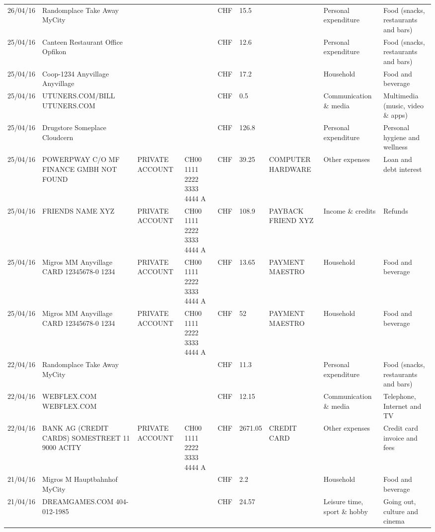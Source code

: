 \begin{landscape}
\begin{table}[t]
\begin{center}
\begin{tabular}{lllllllll}
		26/04/16 & Randomplace Take Away     MyCity &       &       & CHF   & 15.5  &       & Personal expenditure & Food (snacks, restaurants and bars) \\
		25/04/16 & Canteen Restaurant Office      Opfikon &       &       & CHF   & 12.6  &       & Personal expenditure & Food (snacks, restaurants and bars) \\
		25/04/16 & Coop-1234 Anyvillage    Anyvillage &       &       & CHF   & 17.2  &       & Household & Food and beverage \\
		25/04/16 & UTUNERS.COM/BILL          UTUNERS.COM &       &       & CHF   & 0.5   &       & Communication \& media & Multimedia (music, video \& apps) \\
		25/04/16 & Drugstore Someplace      Cloudcern &       &       & CHF   & 126.8 &       & Personal expenditure & Personal hygiene and wellness \\
		25/04/16 & POWERPWAY C/O MF FINANCE GMBH NOT FOUND & PRIVATE ACCOUNT & CH00 1111 2222 3333 4444 A & CHF   & 39.25 & COMPUTER HARDWARE & Other expenses & Loan and debt interest \\
		25/04/16 & FRIENDS NAME XYZ & PRIVATE ACCOUNT & CH00 1111 2222 3333 4444 A & CHF   & 108.9 & PAYBACK FRIEND XYZ & Income \& credits & Refunds \\
		25/04/16 & Migros MM Anyvillage CARD 12345678-0 1234 & PRIVATE ACCOUNT & CH00 1111 2222 3333 4444 A & CHF   & 13.65 & PAYMENT MAESTRO & Household & Food and beverage \\
		25/04/16 & Migros MM Anyvillage CARD 12345678-0 1234 & PRIVATE ACCOUNT & CH00 1111 2222 3333 4444 A & CHF   & 52    & PAYMENT MAESTRO & Household & Food and beverage \\
		22/04/16 & Randomplace Take Away     MyCity &       &       & CHF   & 11.3  &       & Personal expenditure & Food (snacks, restaurants and bars) \\
		22/04/16 & WEBFLEX.COM              WEBFLEX.COM &       &       & CHF   & 12.15 &       & Communication \& media & Telephone,  Internet and TV \\
		22/04/16 & BANK AG (CREDIT CARDS) SOMESTREET 11 9000 ACITY & PRIVATE ACCOUNT & CH00 1111 2222 3333 4444 A & CHF   & 2671.05 & CREDIT CARD & Other expenses & Credit card invoice and fees \\
		21/04/16 & Migros M Hauptbahnhof    MyCity &       &       & CHF   & 2.2   &       & Household & Food and beverage \\
		21/04/16 & DREAMGAMES.COM           404-012-1985 &       &       & CHF   & 24.57 &       & Leisure time, sport \& hobby & Going out, culture and cinema \\

\end{tabular}
\end{center}
\end{table}
\end{landscape}

